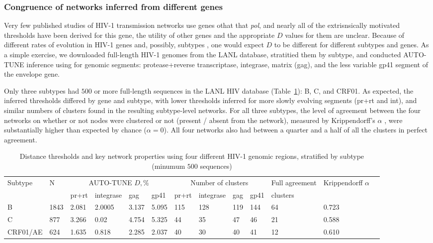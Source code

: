 \documentclass[utf8]{FrontiersinHarvard} %
\begin{document}
\subsubsection{Congruence of networks inferred from different genes}

Very few published studies of HIV-1 transmission networks use genes othat that {\it pol}, and nearly all of the extrisnsically motivated thresholds have been derived for this gene, the utility of other genes and the appropriate $D$ values for them are unclear.  Because of different rates of evolution in HIV-1 genes and, possibly, subtypes \cite{Penn:2008aa}, one would expect $D$ to be different for different subtypes and genes. As a simple exercise, we downloaded full-length HIV-1 genomes from the LANL database, stratitied them by subtype, and conducted AUTO-TUNE inference using for genomic segments: protease+reverse transcriptase, integrase, matrix (gag), and the less variable gp41 segment of the envelope gene. 

Only three subtypes had $500$ or more full-length sequences in the LANL HIV database (Table~\ref{tab:LANL:full}): B, C, and CRF01. As expected, the inferred thresholds differed by gene and subtype, with lower thresholds inferred for more slowly evolving segments (pr+rt and int), and similar numbers of clusters found in the resulting subtype-level networks. For all three subtypes, the level of agreement between the four networks on whether or not nodes were clustered or not (present / absent from the network), measured by Krippendorff's $\alpha$ \cite{doi:10.1080/19312450709336664}, were substantially higher than expected by chance ($\alpha = 0$). All four networks also had between a quarter and a half of all the clusters in perfect agreement. 

\begin{table}[h]
	\caption{Distance thresholds and key network properties using four different HIV-1 genomic regions, stratified by subtype (minumum $500$ sequences)}
	
	\vspace{10pt}
	\centering
	\begin{ssmall}
	\label{tab:LANL:full}
	\begin{tabular}{lllllllllllll}
	   \hline
		Subtype & N &  \multicolumn{4}{c}{AUTO-TUNE $D, \%$} & \multicolumn{4}{c}{Number of clusters} & Full agreement & Krippendorff $\alpha$\\
		& & pr+rt & integrase & gag & gp41 & pr+rt & integrase & gag & gp41 & clusters &  \\
		\hline

		B & 1843 & 2.081 & 2.0005 & 3.137 & 5.095 & 115 & 128 & 119 & 144 & 64 &  0.723\\
		C & 877 & 3.266 & 0.02 & 4.754 & 5.325 & 44 & 35 & 47 & 46 & 21 & 0.588\\
		CRF01/AE & 624 & 1.635 & 0.818 & 2.285 & 2.037 & 40 & 30& 40 & 41 & 12 &  0.610 \\
								
		\hline
	\end{tabular}
	\end{ssmall}
\end{table}
\end{document}
